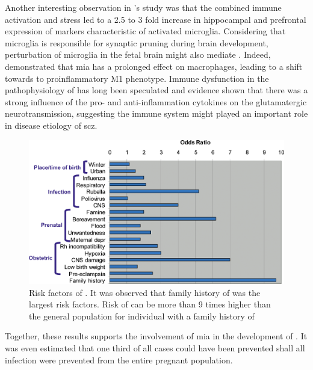 \documentclass[12pt]{book}
\newcommand*{\glng}{\glsentrylong}
\begin{document}
	Another interesting observation in \citet{Giovanoli2013}'s study was that the combined immune activation and stress led to a 2.5 to 3 fold increase in hippocampal and prefrontal expression of markers characteristic of activated microglia.
	Considering that microglia is responsible for synaptic pruning during brain development\citep{Paolicelli2011}, perturbation of microglia in the fetal brain might also mediate \glng{scz}.
	Indeed, \citet{Onore2014} demonstrated that \gls{mia} has a prolonged effect on macrophages, leading to a shift towards to proinflammatory M1 phenotype.
	Immune dysfunction in the pathophysiology of \glng{scz} has long been speculated\citep{Muller2010a} and evidence shown that there was a strong influence of the pro- and anti-inflammation cytokines on the glutamatergic neurotransmission\citep{Muller2010a}, suggesting the immune system might played an important role in disease etiology of \gls{scz}.
	
	\begin{figure}
		\centering
		\includegraphics[width=\textwidth]{figure/risk_factors_of_schizophrenia.png}
		\caption[Risk factors of \glng{scz}]{Risk factors of \glng{scz}.
			It was observed that family history of \glng{scz} was the largest risk factors.
			Risk of \glng{scz} can be more than 9 times higher than the general population for individual with a family history of \glng{scz}}
		\label{fig:riskfactors}
	\end{figure}
	
	Together, these results supports the involvement of \gls{mia} in the development of \glng{scz}.
	It was even estimated that one third of all \glng{scz} cases could have been prevented shall all infection were prevented from the entire pregnant population\citep{Brown2010}.
	
\end{document}
